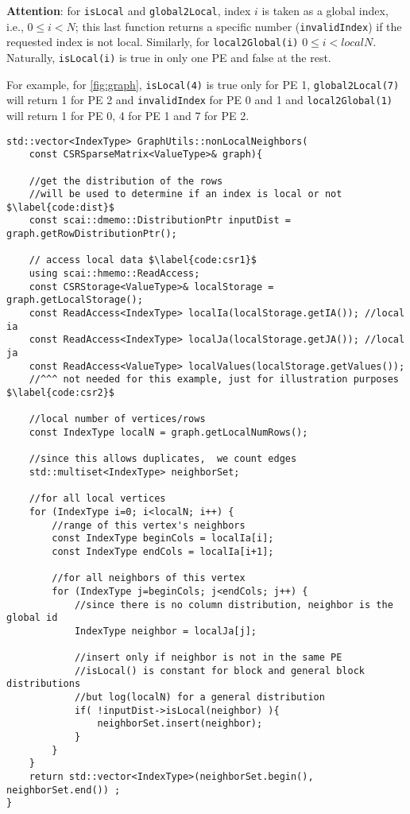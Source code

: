 \documentclass[a4paper,10pt]{article}
\newcommand{\att}{\textbf{Attention}: }
\newcommand{\MI}[1]{\texttt{#1}}
\begin{document}
\att  for \MI{isLocal} and \MI{global2Local}, index $i$ is taken as a global index, i.e., $0\leq i <N$; this last function returns a specific number (\texttt{invalidIndex})
if the requested index is not local. Similarly, for \MI{local2Global(i)} $0\leq i < localN$.
Naturally, \MI{isLocal(i)} is true in only one PE and false at the rest.

For example, for \cref{fig:graph}, \texttt{isLocal(4)} is true only for PE 1, 
\texttt{global2Local(7)} will return 1 for PE 2 and \texttt{invalidIndex} for PE 0 and 1 and
\texttt{local2Global(1)} will return 1 for PE 0, 4 for PE 1 and 7 for PE 2.

%
\begin{algorithm}[h]%
\begin{verbatim}
std::vector<IndexType> GraphUtils::nonLocalNeighbors(
	const CSRSparseMatrix<ValueType>& graph){ 

	//get the distribution of the rows
	//will be used to determine if an index is local or not $\label{code:dist}$
	const scai::dmemo::DistributionPtr inputDist = graph.getRowDistributionPtr();
	
	// access local data $\label{code:csr1}$
	using scai::hmemo::ReadAccess;
	const CSRStorage<ValueType>& localStorage = graph.getLocalStorage();
	const ReadAccess<IndexType> localIa(localStorage.getIA()); //local ia
	const ReadAccess<IndexType> localJa(localStorage.getJA()); //local ja
	const ReadAccess<ValueType> localValues(localStorage.getValues());
	//^^^ not needed for this example, just for illustration purposes $\label{code:csr2}$
	
	//local number of vertices/rows
	const IndexType localN = graph.getLocalNumRows(); 
	
	//since this allows duplicates,  we count edges
	std::multiset<IndexType> neighborSet; 
	
	//for all local vertices
	for (IndexType i=0; i<localN; i++) {
		//range of this vertex's neighbors
		const IndexType beginCols = localIa[i];
		const IndexType endCols = localIa[i+1];
		
		//for all neighbors of this vertex
		for (IndexType j=beginCols; j<endCols; j++) {
			//since there is no column distribution, neighbor is the global id
			IndexType neighbor = localJa[j];
			
			//insert only if neighbor is not in the same PE
			//isLocal() is constant for block and general block distributions
			//but log(localN) for a general distribution
			if( !inputDist->isLocal(neighbor) ){
	        	neighborSet.insert(neighbor);
	        }
		}
	}	
	return std::vector<IndexType>(neighborSet.begin(), neighborSet.end()) ;
}
\end{verbatim}
\caption{Code to get all the non-local neighbors for every vertex. Every PEs goes over only its local
data. Of course, the returned vectors will be different for every PE.}
\label{alg:csrData}
\end{algorithm}
\end{document}
